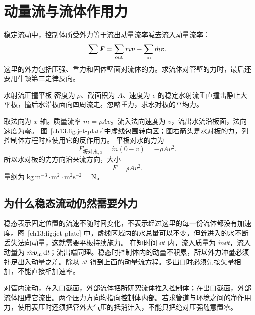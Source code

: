 \section{动量流与流体作用力}\label{ch13:sec:momentum}

稳定流动中，控制体所受外力等于流出动量流率减去流入动量流率：
\begin{equation}
 \sum\bm{F}=\sum_{\rm out}\dot m\bm{v}-
 \sum_{\rm in}\dot m\bm{v}.
\end{equation}
这里的外力包括压强、重力和固体壁面对流体的力。求流体对管壁的力时，最后还要用牛顿第三定律反向。

\begin{origexamplebox}{水射流正撞平板}\label{ch13:ex:jet-plate}
密度为 $\rho$、截面积为 $A$、速度为 $v$ 的稳定水射流垂直撞击静止大平板，撞后水沿板面向四周流走。忽略重力，求水对板的平均力。

\ThQJet
\end{origexamplebox}
\begin{xesolution}
取法向为 $x$ 轴。质量流率 $\dot m=\rho Av$。流入法向速度为 $v$，流出水流沿板面，法向速度为零。
\FluidPlateDiagram
图~\ref{ch13:fig:jet-plate}中虚线包围转向区；图右箭头是水对板的力，列控制体方程时应使用它的反作用力。
平板对水的力为
\[
 F_{\text{板对水},x}=\dot m(0-v)=-\rho Av^2.
\]
所以水对板的力方向沿来流方向，大小
\[
 \boxed{F=\rho Av^2}.
\]
量纲为 $\mathrm{kg\,m^{-3}}\cdot\mathrm{m^2}\cdot\mathrm{m^2s^{-2}}=\mathrm N$。
\end{xesolution}

\subsection{为什么稳态流动仍然需要外力}
稳态表示固定位置的流速不随时间变化，不表示经过这里的每一份流体都没有加速度。图~\ref{ch13:fig:jet-plate} 中，虚线区域内的水总量可以不变，但新进入的水不断丢失法向动量，这就需要平板持续施力。
在短时间 $\dd t$ 内，流入质量为 $\dot m\dd t$，流入动量为 $\dot m\bm{v}_{\rm in}\mathop{}\!\mathrm d t$；流出端同理。稳态时控制体内的动量不积累，所以外力冲量必须补足出入动量之差。除以 $\dd t$ 得到上面的动量流方程。多出口时必须先按矢量相加，不能直接相加速率。

对管内流动，在入口截面，外部流体把所研究流体推入控制体；在出口截面，外部流体阻碍它流出。两个压力方向均指向控制体内部。若求管道与环境之间的净作用力，使用表压时还须把管外大气压的抵消计入，不能只把绝对压强随意置零。

